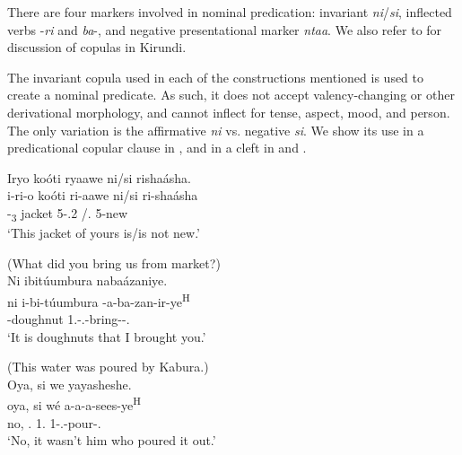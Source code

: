 \documentclass[output=paper]{langscibook}
\begin{document}
There are four markers involved in nominal predication: invariant \textit{ni}/\textit{si}, inflected verbs -\textit{ri} and \textit{ba}-, and negative presentational marker \textit{ntaa}. We also refer to \citet{LafkiouiEtAl2016} for discussion of copulas in Kirundi.

The invariant copula used in each of the constructions mentioned is used to create a nominal predicate. As such, it does not accept valency-changing or other derivational morphology, and cannot inflect for tense, aspect, mood, and person. The only variation is the affirmative \textit{ni} vs. negative \textit{si}. We show its use in a predicational copular clause in , and in a cleft in  and .
\largerpage[2]

\ea
\label{bkm:Ref73705366}
Iryo koóti ryaawe ni/si rishaásha.\\
\gll
i-ri-o  koóti  ri-aawe  ni/si  ri-shaásha\\
-\DEM{}\textsubscript{3}  jacket  5-\POSS.2\SG{}  \COP/\COP.\NEG{}  5-new\\
\glt
‘This jacket of yours is/is not new.’\\

\z

\ea
\label{bkm:Ref75358266}
(What did you bring us from market?)\\
Ni ibitúumbura nabaázaniye.\\
\gll
ni  i-bi-túumbura  \N{}-a-ba-zan-ir-ye\textsuperscript{H}\\
\COP{}  -doughnut  1\SG.\SM-\N.\OM{}-bring-\APPL-\PFV.\REL{}\\
\glt
‘It is doughnuts that I brought you.’\\

\z


\ea
\label{bkm:Ref74741046}
(This water was poured by Kabura.)\\
Oya, si we yayasheshe.\\
\gll
oya,  si  wé  a-a-a-sees-ye\textsuperscript{H}\\
no,  \COP.\NEG{}  1.\PRO{}  1\SM-\N.\OM{}-pour-\PFV.\REL{}\\
\glt
‘No, it wasn’t him who poured it out.’\\
\end{document}
